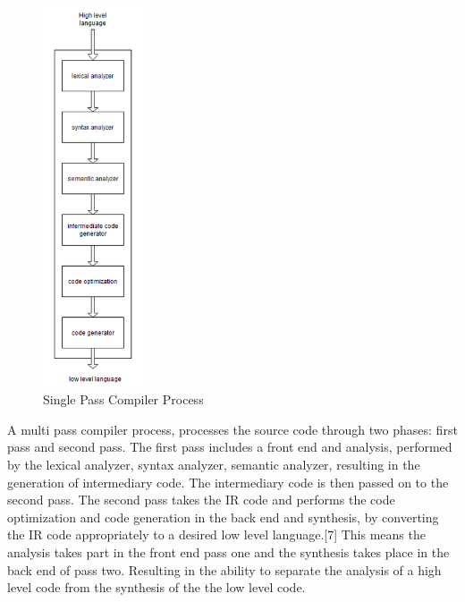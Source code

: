 \documentclass[11pt]{article}
\begin{document}
\pagebreak

\begin{figure}[hbt]
   \begin{center}
     \includegraphics[width=30mm]{figure2.png}
   \end{center}
  \caption{Single Pass Compiler Process}
  \label{fig-sysdesov}
 \end{figure}

A multi pass compiler process, processes the source code through two phases: first pass  and second pass. The first pass includes a front end and analysis, performed by the lexical analyzer, syntax analyzer, semantic analyzer, resulting in the generation of intermediary code. The intermediary code is then passed on to the second pass. The second pass takes the IR code and performs the code optimization and code generation in the back end and synthesis, by converting the IR code appropriately to a desired low level language.[7] This means the analysis takes part in the front end pass one and the synthesis takes place in the back end of pass two. Resulting in the ability to separate the analysis of a high level code from the synthesis of the the low level code.

\pagebreak
\end{document}
